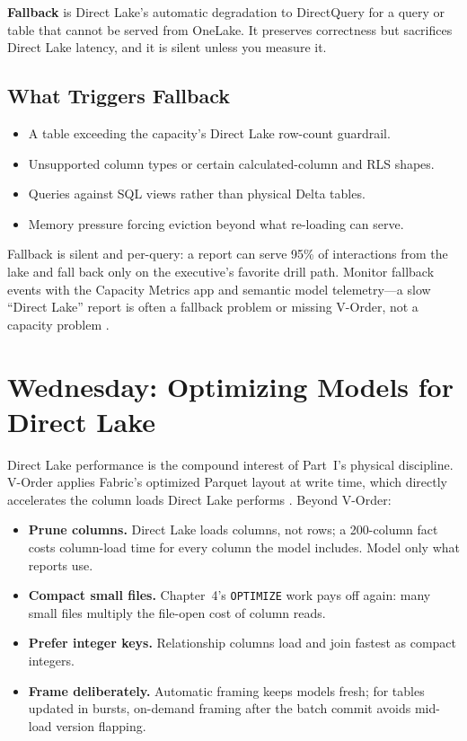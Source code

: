 \begin{definitionbox}
\textbf{Fallback} is Direct Lake's automatic degradation to DirectQuery for a query or table that cannot be served from OneLake. It preserves correctness but sacrifices Direct Lake latency, and it is silent unless you measure it.
\end{definitionbox}

\subsection{What Triggers Fallback}
\begin{itemize}
    \item A table exceeding the capacity's Direct Lake row-count guardrail.
    \item Unsupported column types or certain calculated-column and RLS shapes.
    \item Queries against SQL views rather than physical Delta tables.
    \item Memory pressure forcing eviction beyond what re-loading can serve.
\end{itemize}

\begin{pitfall}
Fallback is silent and per-query: a report can serve 95\% of interactions from the lake and fall back only on the executive's favorite drill path. Monitor fallback events with the Capacity Metrics app and semantic model telemetry---a slow ``Direct Lake'' report is often a fallback problem or missing V-Order, not a capacity problem \cite{microsoftFabricMetricsApp}.
\end{pitfall}

\section{Wednesday: Optimizing Models for Direct Lake}
Direct Lake performance is the compound interest of Part~I's physical discipline. V-Order applies Fabric's optimized Parquet layout at write time, which directly accelerates the column loads Direct Lake performs \cite{microsoftFabricVOrder,microsoftFabricOptimize}. Beyond V-Order:

\begin{itemize}
    \item \textbf{Prune columns.} Direct Lake loads columns, not rows; a 200-column fact costs column-load time for every column the model includes. Model only what reports use.
    \item \textbf{Compact small files.} Chapter~4's \texttt{OPTIMIZE} work pays off again: many small files multiply the file-open cost of column reads.
    \item \textbf{Prefer integer keys.} Relationship columns load and join fastest as compact integers.
    \item \textbf{Frame deliberately.} Automatic framing keeps models fresh; for tables updated in bursts, on-demand framing after the batch commit avoids mid-load version flapping.
\end{itemize}

